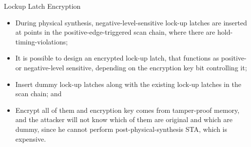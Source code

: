 \begin{frame}{Lockup Latch Encryption}
\begin{itemize}
\item During physical synthesis, negative-level-sensitive lock-up latches are inserted at points in the positive-edge-triggered scan chain, where there are hold-timing-violations; 
\item It is possible to design an encrypted lock-up latch, that functions as positive- or negative-level sensitive, depending on the encryption key bit controlling it; 
\item Insert dummy lock-up latches along with the existing lock-up latches in the scan chain; and 
\item Encrypt all of them and encryption key comes from tamper-proof memory, and the attacker will not know which of them are original and which are dummy, since he cannot perform post-physical-synthesis STA, which is expensive. 
\end{itemize}
\end{frame}
